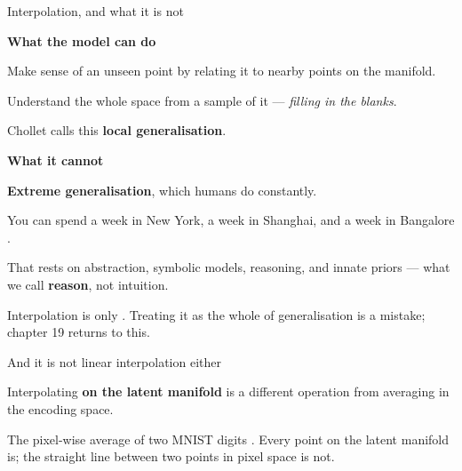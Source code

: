 \documentclass[aspectratio=169,11pt,t]{beamer}
\begin{document}
\begin{frame}[shrink=25]{Interpolation, and what it is not}
\begin{minipage}[t]{0.485\textwidth}
{\fontsize{9.4}{12.6}\selectfont\color{fg2}\textbf{What the model can do}\par}\vskip 4pt
\begin{ibullets}
\item Make sense of an unseen point by relating it to nearby points on the manifold.
\item Understand the whole space from a sample of it --- \textit{filling in the blanks}.
\item Chollet calls this \textbf{local generalisation}.
\end{ibullets}

\end{minipage}%
\hfill
\begin{minipage}[t]{0.485\textwidth}
{\fontsize{9.4}{12.6}\selectfont\color{fg2}\textbf{What it cannot}\par}\vskip 4pt
\begin{ibullets}
\item \textbf{Extreme generalisation}, which humans do constantly.
\item You can spend a week in New York, a week in Shanghai, and a week in Bangalore .
\item That rests on abstraction, symbolic models, reasoning, and innate priors --- what we call \textbf{reason}, not intuition.
\end{ibullets}

\end{minipage}%
\begin{iband}[signal]
Interpolation is only . Treating it as the whole of generalisation is a mistake; chapter 19 returns to this.
\end{iband}
\end{frame}

\begin{frame}[shrink=25]{And it is not linear interpolation either}
{\fontsize{9.4}{12.6}\selectfont\color{fg2}Interpolating \textbf{on the latent manifold} is a different operation from averaging in the encoding space.\par}\vskip 4pt
\begin{iband}[amber]
The pixel-wise average of two MNIST digits . Every point on the latent manifold is; the straight line between two points in pixel space is not.
\end{iband}
\end{frame}
\end{document}

